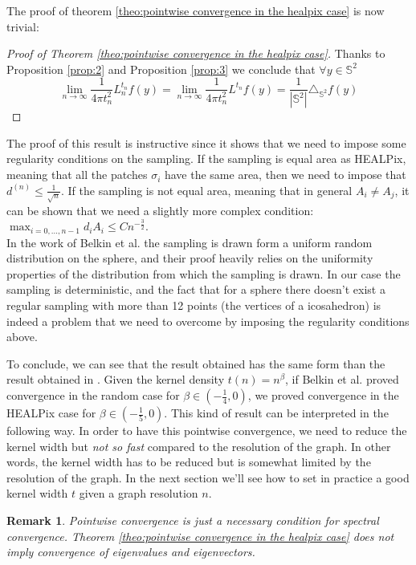 \documentclass{article} %
\newtheorem*{remark}{Remark}
\begin{document}
The proof of theorem \ref{theo:pointwise convergence in the healpix case} is now trivial:
\begin{proof}[Proof of Theorem \ref{theo:pointwise convergence in the healpix case}]
	Thanks to Proposition \ref{prop:2} and Proposition \ref{prop:3}	we conclude that $\forall y\in\mathbb S^2 $
	$$\lim_{n\to\infty}\frac{1}{4\pi t_n^2} L_n^{t_n}f(y) =  \lim_{n\to\infty}\frac{1}{4\pi t_n^2} L^{t_n}f(y) = \frac{1}{|\mathbb S^2|}\triangle_{\mathbb S^2}f(y) $$
\end{proof}

The proof of this result is instructive since it shows that we need to impose some regularity conditions on the sampling. If the sampling is equal area as HEALPix, meaning that all the patches $\sigma_i$ have the same area, then we need to impose that $ d^{(n)}\leq \frac{1}{\sqrt{n}}$. If the sampling is not equal area, meaning that in general $A_i\neq A_j$, it can be shown that we need a slightly more complex condition: $\max_{i=0,...,n-1}d_iA_i\leq Cn^{-\frac{3}{2}}$.\\
In the work of Belkin et al. \cite{Belkin:2005:TTF:2138147.2138189} the sampling is drawn form a uniform random distribution on the sphere, and their proof heavily relies on the uniformity properties of the distribution from which the sampling is drawn. In our case the sampling is deterministic, and the fact that for a sphere there doesn't exist a regular sampling with more than 12 points (the vertices of a icosahedron) is indeed a problem that we need to overcome by imposing the regularity conditions above. 


To conclude, we can see that the result obtained has the same form than the result obtained in \cite{Belkin:2005:TTF:2138147.2138189}. Given the kernel density $t(n)=n^\beta$, if Belkin et al. proved convergence in the random case for $\beta \in (-\frac{1}{4}, 0)$, we proved convergence in the HEALPix case for $\beta \in (-\frac{1}{5}, 0)$. This kind of result can be interpreted in the following way. In order to have this pointwise convergence, we need to reduce the kernel width but \textit{not so fast} compared to the resolution of the graph. In other words, the kernel width has to be reduced but is somewhat limited by the resolution of the graph. In the next section we'll see how to set in practice a good kernel width $t$ given a graph resolution $n$.
\begin{remark}
	Pointwise convergence is just a necessary condition for spectral convergence.  Theorem \ref{theo:pointwise convergence in the healpix case} does not imply convergence of eigenvalues and eigenvectors.
\end{remark}
\end{document}
